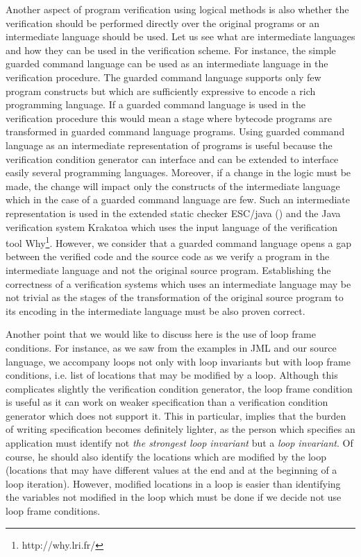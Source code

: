 Another aspect of program verification using logical methods is also whether the verification should be performed directly over the original programs
or  an intermediate language should be used. Let us see what are intermediate languages and how they can be used in the verification scheme.
For instance, the simple guarded command language can be used as an intermediate language in the verification procedure.
 The guarded command   language supports  only few program constructs but which are 
sufficiently expressive to encode a rich programming language. 
If a guarded command language is used in the verification procedure this would mean 
a stage where  bytecode programs are transformed in guarded command language programs.
Using guarded command language as an intermediate representation of programs
is useful because the verification condition generator can interface and can be extended to interface 
easily several programming languages. Moreover, if a change in the logic must be made, the change will impact only
 the constructs of the intermediate language which in the case of a guarded command language are few.
Such an intermediate representation is used in the extended static checker
ESC/java (\cite{escjava}) and the Java verification system Krakatoa \cite{marche03krakatoa} which uses the input language of the verification tool Why\footnote{http://why.lri.fr/}.
However, we consider that a guarded command language 
opens a gap between  the verified code and the source code as we verify  a program in the intermediate language and not the original source program.
Establishing the correctness of a verification systems which uses an intermediate language
may be not trivial as the stages of the transformation of the original source program to its encoding in the intermediate language must be also proven correct. 

Another point that we would like to discuss here is the use of loop frame conditions. 
For instance, as  we saw from the examples in JML and our source language, we accompany loops not only with 
loop invariants but with loop frame conditions, i.e. list of locations that may be modified by a loop.
Although this complicates slightly the verification condition generator, the loop frame condition is useful as it can work 
on weaker specification than a verification condition generator which does not support it. This in particular, implies that the burden of writing specification 
becomes definitely lighter, as the person which specifies an application must identify not  \textit{the strongest loop invariant }
but a \textit{loop invariant}. Of course, he should also identify  the locations which are modified by the loop (locations that may have different values 
at the end and at the beginning of a loop iteration). However, modified locations in a loop is easier than identifying the variables not modified in the loop which 
must be done if we decide not use loop frame conditions. 

